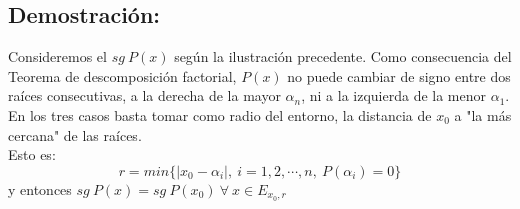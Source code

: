 \documentclass[12pt]{article}
\begin{document}
\subsection*{Demostración:}
\begin{center}
\end{center}

Consideremos el $sg \ P(x)$ según la ilustración precedente. Como consecuencia del Teorema de descomposición factorial, $P(x)$ no puede cambiar de signo entre dos raíces consecutivas, a la derecha de la mayor ${\alpha}_n$, ni a la izquierda de la menor ${\alpha}_1$. \\
En los tres casos basta tomar como radio del entorno, la distancia de ${x}_0$ a "la más cercana" de las raíces.\\
Esto es:
$$
  r=min \{|{x}_0-{\alpha}_i|, \ i=1,2,\cdots,n, \ P({\alpha}_i)=0\}
$$
y entonces $sg \ P(x)=sg \ P({x}_0) \ \forall \ x \in {E}_{{x}_0, r}$
\end{document}
